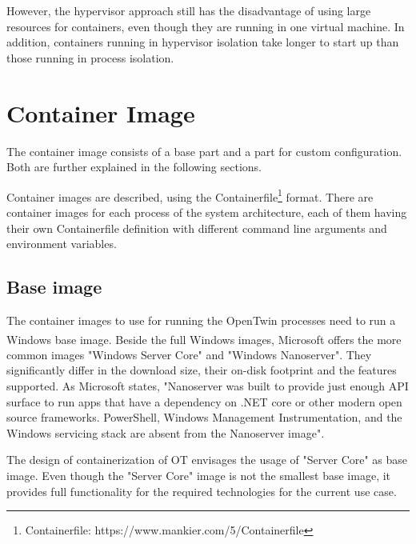 However, the hypervisor approach still has the disadvantage of using large resources for containers, even though they are running in one virtual machine. In addition, containers running in hypervisor isolation take longer to start up than those running in process isolation\cite{RamosApolinario.2021}.




\section{Container Image}
The container image consists of a base part and a part for custom configuration. Both are further explained in the following sections.

Container images are described, using the Containerfile\footnote{Containerfile: https://www.mankier.com/5/Containerfile} format. %
There are container images for each process of the system architecture, each of them having their own Containerfile definition with different command line arguments and environment variables.


\subsection{Base image}
The container images to use for running the OpenTwin processes need to run a \ac{Windows} base image. Beside the full \ac{Windows} images, Microsoft\textsuperscript{\tiny\textregistered} offers the more common images "\ac{Windows} Server Core" and "\ac{Windows} Nanoserver"\cite{MattbriggsMicrosoft.20230214}. They significantly differ in the download size, their on-disk footprint and the features supported\cite{MattbriggsMicrosoft.20230214}. As Microsoft states, "Nanoserver was built to provide just enough \ac{API} surface to run apps that have a dependency on .NET core or other modern open source frameworks. PowerShell, Windows Management Instrumentation, and the \ac{Windows} servicing stack are absent from the Nanoserver image"\cite{MattbriggsMicrosoft.20230214}.

The design of containerization of \ac{OT} envisages the usage of "Server Core" as base image. Even though the "Server Core" image is not the smallest base image, it provides full functionality for the required technologies for the current use case.


